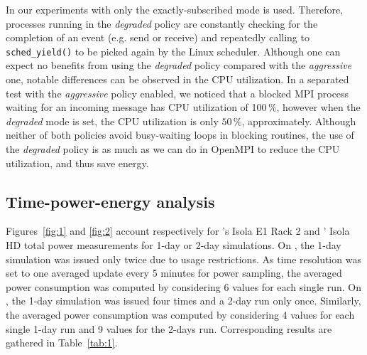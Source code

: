 In our experiments with \cosmoart only the exactly-subscribed mode  is
used. Therefore, \cosmoart processes running  in  the  \emph{degraded} 
policy are constantly checking for the completion  of  an  event (e.g. 
send or receive) and repeatedly calling to  \texttt{sched\_yield()} to 
be picked again by the Linux scheduler. Although one can expect no benefits 
from   using   the  \emph{degraded}   policy   compared   with     the 
\emph{aggressive} one, notable differences can be observed in the CPU utilization. 
In a separated  test  with  the  \emph{aggressive}  policy 
enabled, we noticed that a blocked MPI process waiting for an incoming 
message has CPU utilization of 100\,\%,  however  when  the \emph{degraded} 
mode  is  set,  the  CPU  utilization is only $50\,\%$, approximately. 
Although neither of both policies avoid busy-waiting loops in blocking 
routines, the use of the \emph{degraded} policy is as much as we can 
do in OpenMPI to reduce the CPU utilization, and thus save energy.


\subsection{Time-power-energy analysis}
\label{subsec:4.2}

Figures~\ref{fig:1} and \ref{fig:2}  account respectively for \monch's
Isola  E1 Rack 2  and \pilat'  Isola HD  total power  measurements for
1-day or 2-day simulations. On \monch, the 1-day simulation was issued
only twice due  to usage restrictions.  As time  resolution was set to
one averaged update every  5 minutes  for power  sampling, the  averaged power
consumption was computed by considering  6 values for each single run.
On \pilat, the 1-day simulation was  issued four times and a 2-day run
only once.  Similarly, the  averaged power consumption was computed by
considering 4  values for each single  1-day run and 9  values for the
2-days run. Corresponding results are gathered in Table~\ref{tab:1}.

